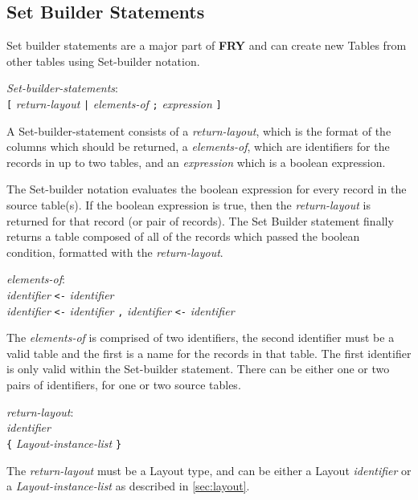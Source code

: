 \documentclass{article}
\begin{document}
\subsection{Set Builder Statements}
\label{sec:setbuild}
Set builder statements are a major part of \textbf{FRY} and can create new Tables from other tables using Set-builder notation.
\begin{tabbing}
	\= \emph{Set-bu}\=\emph{ilder-statements}: \\
	\> \> \texttt{[} \emph{return-layout} \texttt{|} \emph{elements-of} \texttt{;} \emph{expression} \texttt{]}
\end{tabbing}

A Set-builder-statement consists of a \emph{return-layout}, which is the format of the columns which should be returned, a \emph{elements-of}, which are identifiers for the records in up to two tables, and an \emph{expression} which is a boolean expression.

 The Set-builder notation evaluates the boolean expression for every record in the source table(s). If the boolean expression is true, then the \emph{return-layout} is returned for that record (or pair of records). The Set Builder statement finally returns a table composed of all of the records which passed the boolean condition, formatted with the \emph{return-layout}.

\begin{tabbing}
	\= \emph{elem}\=\emph{ents-of}: \\
	\> \> \emph{identifier} \texttt{<-} \emph{identifier} \\
	\> \> \emph{identifier} \texttt{<-} \emph{identifier} \texttt{,}  \emph{identifier} \texttt{<-} \emph{identifier}
\end{tabbing}

The \emph{elements-of} is comprised of two identifiers, the second identifier must be a valid table and the first is a name for the records in that table. The first identifier is only valid within the Set-builder statement. There can be either one or two pairs of identifiers, for one or two source tables.

\begin{tabbing}
	\= \emph{retu}\=\emph{rn-layout}: \\
	\> \> \emph{identifier} \\
	\> \> \texttt{\{} \emph{Layout-instance-list} \texttt{\}}
\end{tabbing}
The \emph{return-layout} must be a Layout type, and can be either a Layout \emph{identifier} or a \emph{Layout-instance-list} as described in \ref{sec:layout}.
\end{document}
